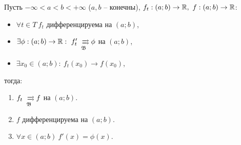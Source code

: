 

\begin{theorem}
    Пусть $ -\infty < a < b < +\infty $ ($ a,b $ -- конечны), $ f_t: (a;b)\rightarrow\R, \ f:(a;b) \rightarrow \R $:
    \begin{itemize}
        \item $ \forall t \in T \ f_t $ дифференцируема на $ (a;b) $,
        \item $ \exists \phi: (a;b)\rightarrow\R: \ f_t' \xrightrightarrows[\mathfrak{B}]{} \phi $ на $ (a;b) $,
        \item $ \exists x_0 \in (a;b): \ f_t(x_0) \rightarrow f(x_0) $,
    \end{itemize}
    тогда:
    \begin{enumerate}
        \item $ f_t \xrightrightarrows[\mathfrak{B}]{} f $ на $ (a;b) $.
        \item $ f $ дифференцируема на $ (a;b) $.
        \item $ \forall x \in (a;b) \ f'(x) = \phi(x) $.
    \end{enumerate}
\end{theorem}

